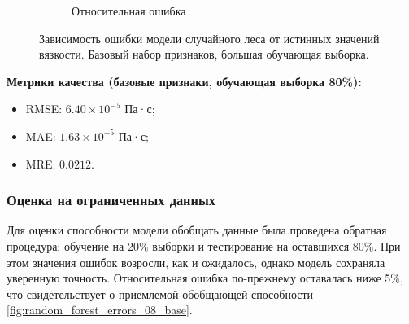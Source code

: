 \documentclass[a4paper,12pt]{article}
\begin{document}
\begin{figure}[ht!]
\begin{subfigure}{0.48\textwidth}
          \caption{Относительная ошибка}
      \end{subfigure}
      \caption{Зависимость ошибки модели случайного леса от истинных значений вязкости. Базовый набор признаков, большая обучающая выборка.}
      \label{fig:random_forest_errors_02_base}
    \end{figure}
    
    \vspace{5mm}
    \begin{minipage}{\textwidth}
      \textbf{Метрики качества (базовые признаки, обучающая выборка 80\%):}
      \begin{itemize}
          \item RMSE: \( 6.40 \times 10^{-5} \) Па·с;
          \item MAE: \( 1.63 \times 10^{-5} \) Па·с;
          \item MRE: \( 0.0212 \).
      \end{itemize}
    \end{minipage}
    
    \subsubsection{Оценка на ограниченных данных}
    
    Для оценки способности модели обобщать данные была проведена обратная процедура: обучение на 20\% выборки и тестирование на оставшихся 80\%. При этом значения ошибок возросли, как и ожидалось, однако модель сохраняла уверенную точность. Относительная ошибка по-прежнему оставалась ниже 5\%, что свидетельствует о приемлемой обобщающей способности \autoref{fig:random_forest_errors_08_base}.
    
\end{document}
